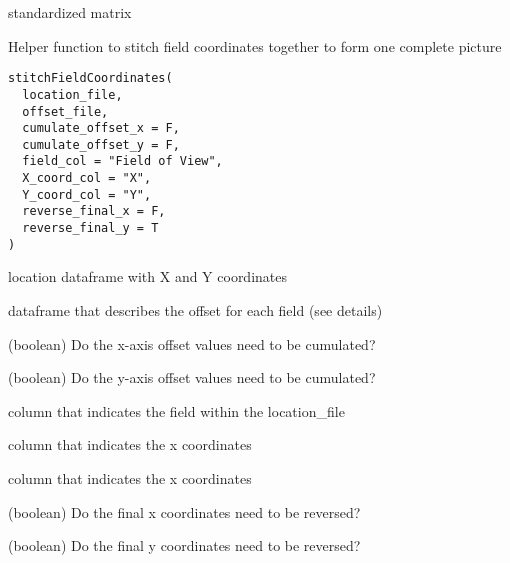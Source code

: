 \documentclass[a4paper]{book}
\begin{document}
%
\begin{Value}
standardized matrix
\end{Value}
%
\begin{Description}\relax
Helper function to stitch field coordinates together to form one complete picture
\end{Description}
%
\begin{Usage}
\begin{verbatim}
stitchFieldCoordinates(
  location_file,
  offset_file,
  cumulate_offset_x = F,
  cumulate_offset_y = F,
  field_col = "Field of View",
  X_coord_col = "X",
  Y_coord_col = "Y",
  reverse_final_x = F,
  reverse_final_y = T
)
\end{verbatim}
\end{Usage}
%
\begin{Arguments}
\begin{ldescription}
\item[\code{location\_file}] location dataframe with X and Y coordinates

\item[\code{offset\_file}] dataframe that describes the offset for each field (see details)

\item[\code{cumulate\_offset\_x}] (boolean) Do the x-axis offset values need to be cumulated?

\item[\code{cumulate\_offset\_y}] (boolean) Do the y-axis offset values need to be cumulated?

\item[\code{field\_col}] column that indicates the field within the location\_file

\item[\code{X\_coord\_col}] column that indicates the x coordinates

\item[\code{Y\_coord\_col}] column that indicates the x coordinates

\item[\code{reverse\_final\_x}] (boolean) Do the final x coordinates need to be reversed?

\item[\code{reverse\_final\_y}] (boolean) Do the final y coordinates need to be reversed?
\end{ldescription}
\end{Arguments}
%
\end{document}
